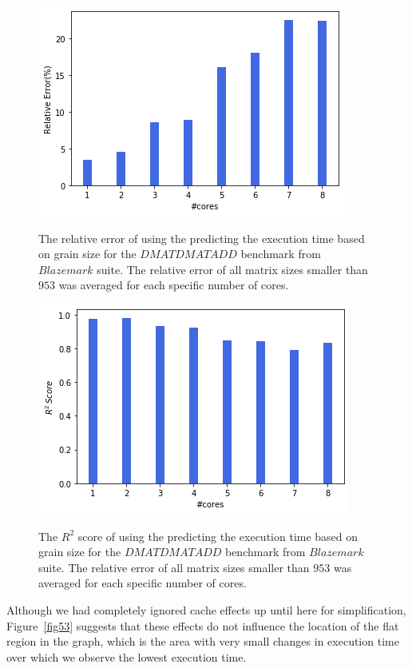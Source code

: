 \begin{figure}[H]
	\centering
	{\includegraphics[scale=.45]{images/hpx_for_loop/blazemark/100000000/marvin_relative_error_less_953.png}}
	\caption{The relative error of using the predicting the execution time based on grain size for the $DMATDMATADD$ benchmark from $Blazemark$ suite. The relative error of all matrix sizes smaller than $953$ was averaged for each specific number of cores.}\label{fig54}		
\end{figure}

\begin{figure}[H]
	\centering
	{\includegraphics[scale=.45]{images/hpx_for_loop/blazemark/100000000/marvin_r2_error_less_953.png}}
	\caption{The $R^2$ score of using the predicting the execution time based on grain size for the $DMATDMATADD$ benchmark from $Blazemark$ suite. The relative error of all matrix sizes smaller than $953$ was averaged for each specific number of cores.}\label{fig55}		
\end{figure}

Although we had completely ignored cache effects up until here for simplification, Figure~\ref{fig53} suggests that these effects do not influence the location of the flat region in the graph, which is the area with very small changes in execution time over which we observe the lowest execution time.   

